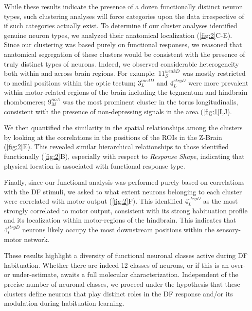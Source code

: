 \documentclass[9pt,lineno]{RandlettLab_elife}
\begin{document}
\vspace{5mm}

While these results indicate the presence of a dozen functionally distinct neuron types, such clustering analyses will force categories upon the data irrespective of if such categories actually exist. To determine if our cluster analyses identified genuine neuron types, we analyzed their anatomical localization (\autoref{fig:2}C-E). Since our clustering was based purely on functional responses, we reasoned that anatomical segregation of these clusters would be consistent with the presence of truly distinct types of neurons. Indeed, we observed considerable heterogeneity both within and across brain regions. For example: $11_{S}^{weakD}$ was mostly restricted to medial positions within the optic tectum; $3_{L}^{medD}$ and $4_{L}^{strgD}$ were more prevalent within motor-related regions of the brain including the tegmentum and hindbrain rhombomeres; $9_{M}^{noA}$ was the most prominent cluster in the torus longitudinalis, consistent with the presence of non-depressing signals in the area (\autoref{fig:1}I,J). 

We then quantified the similarity in the spatial relationships among the clusters by looking at the correlations in the positions of the ROIs in the Z-Brain (\autoref{fig:2}E). This revealed similar hierarchical relationships to those identified functionally (\autoref{fig:2}B), especially with respect to \emph{Response Shape}, indicating that physical location is associated with functional response type.  

Finally, since our functional analysis was performed purely based on correlations with the DF stimuli, we asked to what extent neurons belonging to each cluster were correlated with motor output (\autoref{fig:2}F). This identified $4_{L}^{strgD}$ as the most strongly correlated to motor output, consistent with its strong habituation profile and its localization within motor-regions of the hindbrain. This indicates that $4_{L}^{strgD}$ neurons likely occupy the most downstream positions within the sensory-motor network. 

These results highlight a diversity of functional neuronal classes active during DF habituation. Whether there are indeed 12 classes of neurons, or if this is an over- or under-estimate, awaits a full molecular characterization. Independent of the precise number of neuronal classes, we proceed under the hypothesis that these clusters define neurons that play distinct roles in the DF response and/or its modulation during habituation learning. 
\end{document}
